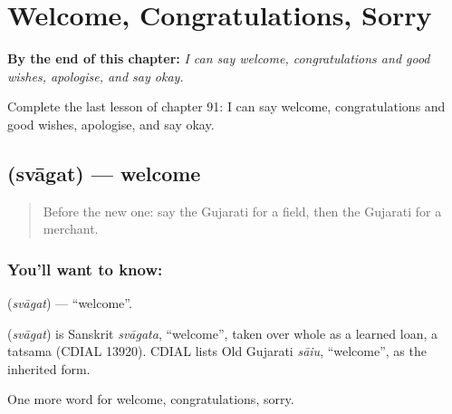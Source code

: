 
\chapter{Welcome, Congratulations, Sorry}
\label{ch:gu-welcome-congratulations-sorry}

\begin{chapteropening}
\textbf{By the end of this chapter:} \emph{I can say welcome, congratulations and good wishes, apologise, and say okay.}

Complete the last lesson of chapter 91: I can say welcome, congratulations and good wishes, apologise, and say okay.
\end{chapteropening}

\section[\texorpdfstring{\gu{સ્વાગત} (svāgat)}{સ્વાગત (svāgat)}]{ (svāgat) — welcome}

\label{lesson:GU-C91-welcome}



\begin{quote}
Before the new one: say the Gujarati for a field, then the Gujarati for a merchant.
\end{quote}

\subsection*{You'll want to know: }
\textbf{} (\emph{svāgat}) — \textquotedblleft{}welcome\textquotedblright{}.

\begin{cousinweb}
\textbf{} (\emph{svāgat}) is Sanskrit \emph{svāgata}, \textquotedblleft{}welcome\textquotedblright{}, taken over whole as a learned loan, a tatsama (CDIAL 13920). CDIAL lists Old Gujarati \emph{sāiu}, \textquotedblleft{}welcome\textquotedblright{}, as the inherited form.
\end{cousinweb}

\begin{grammarlens}[title={What you've built}]
One more word for welcome, congratulations, sorry.
\end{grammarlens}

